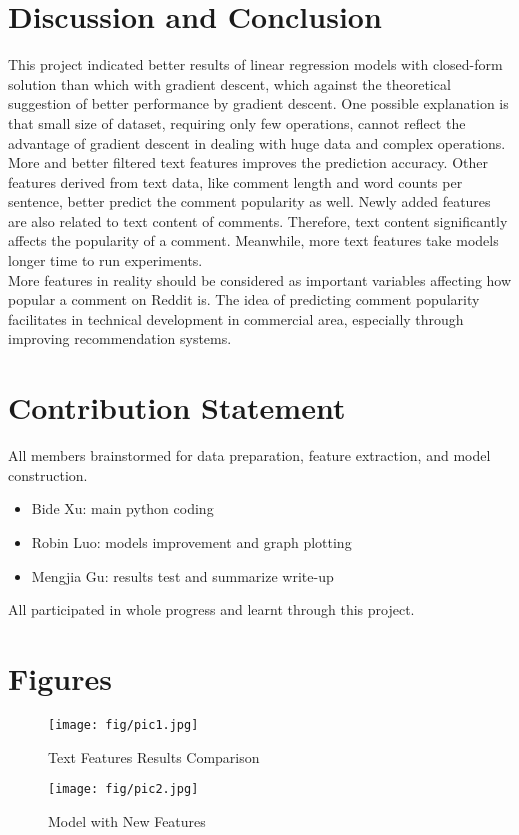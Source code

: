 \documentclass[letterpaper, 12pt]{article}
\begin{document}
\section*{Discussion and Conclusion}

This project indicated better results of linear regression models with closed-form solution than which with gradient descent, which against the theoretical suggestion of better performance by gradient descent. One possible explanation is that small size of dataset, requiring only few operations, cannot reflect the advantage of gradient descent in dealing with huge data and complex operations.\\

More and better filtered text features improves the prediction accuracy. Other features derived from text data, like comment length and word counts per sentence, better predict the comment popularity as well. Newly added features are also related to text content of comments. Therefore, text content significantly affects the popularity of a comment. Meanwhile, more text features take models longer time to run experiments.\\

More features in reality should be considered as important variables affecting how popular a comment on Reddit is. The idea of predicting comment popularity facilitates in technical development in commercial area, especially through improving recommendation systems.

\nocite{*}


\begingroup
    
\endgroup

\newpage
\section*{Contribution Statement}

All members brainstormed for data preparation, feature extraction, and model construction.
\begin{itemize}
    \item Bide Xu: main python coding
    \item Robin Luo: models improvement and graph plotting
    \item Mengjia Gu: results test and summarize write-up
\end{itemize}All participated in whole progress and learnt through this project.

\newpage
\section*{Figures}

\begin{figure}[h]
\centering
\texttt{[image: fig/pic1.jpg]}
\caption{Text Features Results Comparison}
\label{fig: fig1}
\end{figure}

\begin{figure}[h]
\centering
\texttt{[image: fig/pic2.jpg]}
\caption{Model with New Features}
\label{fig: fig2}
\end{figure}
\end{document}
